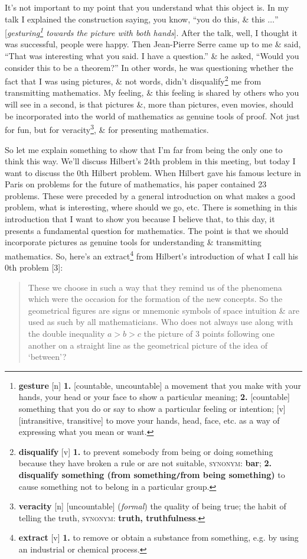 \documentclass[oneside]{book}
\numberwithin{equation}{section}
\begin{document}
It's not important to my point that you understand what this object is. In my talk I explained the construction saying, you know, ``you do this, \& this $\ldots$'' [\textit{gesturing\footnote{\textbf{gesture} [n] \textbf{1.} [countable, uncountable] a movement that you make with your hands, your head or your face to show a particular meaning; \textbf{2.} [countable] something that you do or say to show a particular feeling or intention; [v] [intransitive, transitive] to move your hands, head, face, etc. as a way of expressing what you mean or want.} towards the picture with both hands}]. After the talk, well, I thought it was successful, people were happy. Then Jean-Pierre Serre came up to me \& said, ``That was interesting what you said. I have a question.'' \& he asked, ``Would you consider this to be a theorem?'' In other words, he was questioning whether the fact that I was using pictures, \& not words, didn't disqualify\footnote{\textbf{disqualify} [v] \textbf{1.} to prevent somebody from being or doing something because they have broken a rule or are not suitable, \textsc{synonym}: \textbf{bar}; \textbf{2.} \textbf{disqualify something (from something\texttt{/}from being something)} to cause something not to belong in a particular group.} me from transmitting mathematics. My feeling, \& this feeling is shared by others who you will see in a second, is that pictures \&, more than pictures, even movies, should be incorporated into the world of mathematics as genuine tools of proof. Not just for fun, but for veracity\footnote{\textbf{veracity} [n] [uncountable] (\textit{formal}) the quality of being true; the habit of telling the truth, \textsc{synonym}: \textbf{truth, truthfulness}.}, \& for presenting mathematics.

So let me explain something to show that I'm far from being the only one to think this way. We'll discuss Hilbert's 24th problem in this meeting, but today I want to discuss the 0th Hilbert problem. When Hilbert gave his famous lecture in Paris on problems for the future of mathematics, his paper contained 23 problems. These were preceded by a general introduction on what makes a good problem, what is interesting, where should we go, etc. There is something in this introduction that I want to show you because I believe that, to this day, it presents a fundamental question for mathematics. The point is that we should incorporate pictures as genuine tools for understanding \& transmitting mathematics. So, here's an extract\footnote{\textbf{extract} [v] \textbf{1.} to remove or obtain a substance from something, e.g. by using an industrial or chemical process.} from Hilbert's introduction of what I call his 0th problem [3]:
\begin{quotation}
	 These we choose in such a way that they remind us of the phenomena which were the occasion for the formation of the new concepts. So the geometrical figures are signs or mnemonic symbols of space intuition \& are used as such by all mathematicians. Who does not always use along with the double inequality $a > b > c$ the picture of 3 points following one another on a straight line as the geometrical picture of the idea of `between'?
\end{quotation}
\end{document}
